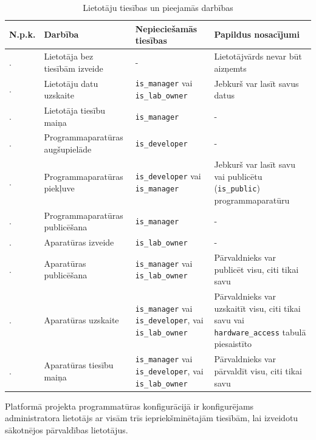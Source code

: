 \begin{table}[H]
    \newcommand\rownumber{\stepcounter{permissioncounter}\arabic{permissioncounter}.}
    \begin{tabular}{ |p{1cm}|p{5cm}|p{3cm}|p{6cm}| }
    \hline
    N.p.k.&Darbība&Nepieciešamās tiesības&Papildus nosacījumi \\
    \hline
    \rownumber & Lietotāja bez tiesībām izveide & - & Lietotājvārds nevar būt aizņemts \\
    \hline
    \rownumber & Lietotāju datu uzskaite & \lstinline!is_manager! vai \lstinline!is_lab_owner! & Jebkurš var lasīt savus datus \\
    \hline
    \rownumber & Lietotāja tiesību maiņa & \lstinline!is_manager! & - \\
    \hline
    \rownumber & Programmaparatūras augšupielāde & \lstinline!is_developer! & - \\
    \hline
    \rownumber & Programmaparatūras piekļuve & \lstinline!is_developer! vai
        \lstinline!is_manager! & Jebkurš var lasīt savu vai publicētu
        (\lstinline!is_public!) programmaparatūru \\
    \hline
    \rownumber & Programmaparatūras publicēšana & \lstinline!is_manager! & - \\
    \hline
    \rownumber & Aparatūras izveide & \lstinline!is_lab_owner! & - \\
    \hline
    \rownumber & Aparatūras publicēšana & \lstinline!is_manager! vai
        \lstinline!is_lab_owner! & Pārvaldnieks var publicēt visu, citi tikai
        savu \\
    \hline
    \rownumber & Aparatūras uzskaite & \lstinline!is_manager! vai
        \lstinline!is_developer!, vai \lstinline!is_lab_owner! & Pārvaldnieks
        var uzskaitīt visu, citi tikai savu vai \lstinline!hardware_access!
        tabulā piesaistīto \\
    \hline
    \rownumber & Aparatūras tiesību maiņa & \lstinline!is_manager! vai
        \lstinline!is_developer!, vai \lstinline!is_lab_owner! & Pārvaldnieks
        var pārvaldīt visu, citi tikai savu \\
    \hline
    \end{tabular}
    \centering
    \captionsetup{justification=centering}
    \caption{Lietotāju tiesības un pieejamās darbības}
    \label{table:permissions}
\end{table}

Platformā projekta programmatūras konfigurācijā ir konfigurējams administratora
lietotājs ar visām trīs iepriekšminētajām tiesībām, lai izveidotu sākotnējos
pārvaldības lietotājus.

